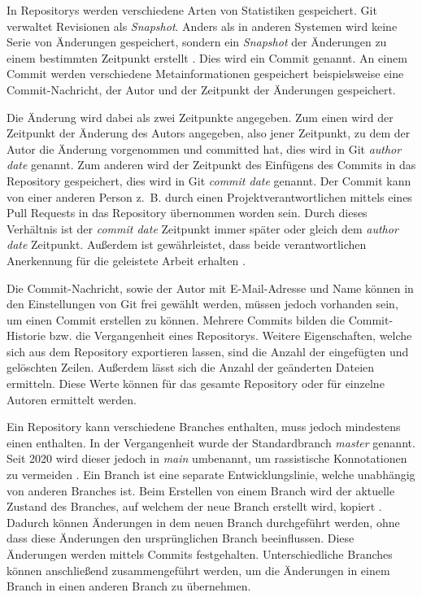 In Repositorys werden verschiedene Arten von Statistiken gespeichert.
Git verwaltet Revisionen als \emph{Snapshot}.
Anders als in anderen Systemen wird keine Serie von Änderungen gespeichert, sondern ein \emph{Snapshot} der Änderungen zu einem bestimmten Zeitpunkt erstellt \autocite{ponuthorai_version_2022}.
Dies wird ein Commit genannt.
An einem Commit werden verschiedene Metainformationen gespeichert beispielsweise eine Commit-Nachricht, der Autor und der Zeitpunkt der Änderungen gespeichert.

Die Änderung wird dabei als zwei Zeitpunkte angegeben.
Zum einen wird der Zeitpunkt der Änderung des Autors angegeben, also jener Zeitpunkt, zu dem der Autor die Änderung vorgenommen und committed hat, dies wird in Git \textit{author date} genannt.
Zum anderen wird der Zeitpunkt des Einfügens des Commits in das Repository gespeichert, dies wird in Git \textit{commit date} genannt.
Der Commit kann von einer anderen Person z. B. durch einen Projektverantwortlichen mittels eines Pull Requests in das Repository übernommen worden sein.
Durch dieses Verhältnis ist der \textit{commit date} Zeitpunkt immer später oder gleich dem \textit{author date} Zeitpunkt.
Außerdem ist gewährleistet, dass beide verantwortlichen Anerkennung für die geleistete Arbeit erhalten \autocite{chacon_pro_2024}.

Die Commit-Nachricht, sowie der Autor mit E-Mail-Adresse und Name können in den Einstellungen von Git frei gewählt werden, müssen jedoch vorhanden sein, um einen Commit erstellen zu können.
Mehrere Commits bilden die Commit-Historie bzw. die Vergangenheit eines Repositorys.
Weitere Eigenschaften, welche sich aus dem Repository exportieren lassen, sind die Anzahl der eingefügten und gelöschten Zeilen.
Außerdem lässt sich die Anzahl der geänderten Dateien ermitteln.
Diese Werte können für das gesamte Repository oder für einzelne Autoren ermittelt werden.

Ein Repository kann verschiedene Branches enthalten, muss jedoch mindestens einen enthalten.
In der Vergangenheit wurde der Standardbranch \emph{master} genannt.
Seit 2020 wird dieser jedoch in \emph{main} umbenannt, um rassistische Konnotationen zu vermeiden \autocite{github_githubrenaming_2024}.
Ein Branch ist eine separate Entwicklungslinie, welche unabhängig von anderen Branches ist.
Beim Erstellen von einem Branch wird der aktuelle Zustand des Branches, auf welchem der neue Branch erstellt wird, kopiert \autocite{ponuthorai_version_2022}.
Dadurch können Änderungen in dem neuen Branch durchgeführt werden, ohne dass diese Änderungen den ursprünglichen Branch beeinflussen.
Diese Änderungen werden mittels Commits festgehalten.
Unterschiedliche Branches können anschließend zusammengeführt werden, um die Änderungen in einem Branch in einen anderen Branch zu übernehmen.

